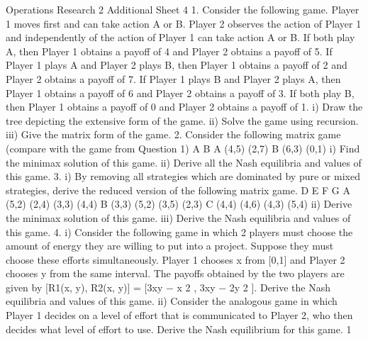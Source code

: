 Operations Research 2
Additional Sheet 4
1. Consider the following game. Player 1 moves first and can take action A or B.
Player 2 observes the action of Player 1 and independently of the action of Player 1 can
take action A or B. If both play A, then Player 1 obtains a payoff of 4 and Player 2
obtains a payoff of 5. If Player 1 plays A and Player 2 plays B, then Player 1 obtains a
payoff of 2 and Player 2 obtains a payoff of 7. If Player 1 plays B and Player 2 plays A,
then Player 1 obtains a payoff of 6 and Player 2 obtains a payoff of 3. If both play B,
then Player 1 obtains a payoff of 0 and Player 2 obtains a payoff of 1.
i) Draw the tree depicting the extensive form of the game.
ii) Solve the game using recursion.
iii) Give the matrix form of the game.
2. Consider the following matrix game (compare with the game from Question 1)
A B
A (4,5) (2,7)
B (6,3) (0,1)
i) Find the minimax solution of this game.
ii) Derive all the Nash equilibria and values of this game.
3. i) By removing all strategies which are dominated by pure or mixed strategies,
derive the reduced version of the following matrix game.
D E F G
A (5,2) (2,4) (3,3) (4,4)
B (3,3) (5,2) (3,5) (2,3)
C (4,4) (4,6) (4,3) (5,4)
ii) Derive the minimax solution of this game.
iii) Derive the Nash equilibria and values of this game.
4. i) Consider the following game in which 2 players must choose the amount of
energy they are willing to put into a project. Suppose they must choose these efforts
simultaneously. Player 1 chooses x from [0,1] and Player 2 chooses y from the same
interval. The payoffs obtained by the two players are given by
[R1(x, y), R2(x, y)] = [3xy − x
2
, 3xy − 2y
2
].
Derive the Nash equilibria and values of this game.
ii) Consider the analogous game in which Player 1 decides on a level of effort that is
communicated to Player 2, who then decides what level of effort to use. Derive the Nash
equilibrium for this game.
1



